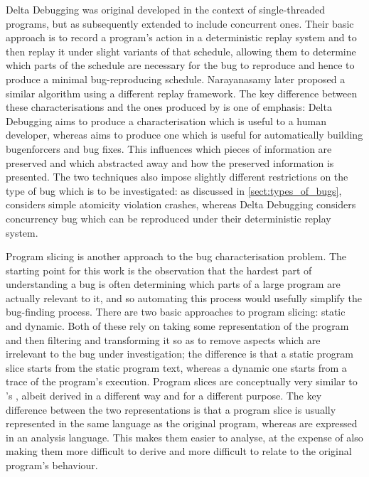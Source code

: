 Delta Debugging was original developed in the context of
single-threaded programs, but as subsequently extended to include
concurrent ones\cite{Choi2002}.  Their basic approach is to record a
program's action in a deterministic replay system and to then replay
it under slight variants of that schedule, allowing them to determine
which parts of the schedule are necessary for the bug to reproduce and
hence to produce a minimal bug-reproducing schedule.
Narayanasamy\cite{Narayanasamy2007} later proposed a similar algorithm
using a different replay framework.  The key difference between these
characterisations and the ones produced by {\technique} is one of
emphasis: Delta Debugging aims to produce a characterisation which is
useful to a human developer, whereas {\technique} aims to produce one
which is useful for automatically building \glspl{bugenforcer} and bug
fixes.  This influences which pieces of information are preserved and
which abstracted away and how the preserved information is presented.
The two techniques also impose slightly different restrictions on the
type of bug which is to be investigated: as discussed in
\autoref{sect:types_of_bugs}, {\technique} considers simple atomicity
violation crashes, whereas Delta Debugging considers concurrency bug
which can be reproduced under their deterministic replay system.

Program slicing is another approach to the bug characterisation
problem.  The starting point for this work is the observation that the
hardest part of understanding a bug is often determining which parts
of a large program are actually relevant to it, and so automating this
process would usefully simplify the bug-finding process.  There are
two basic approaches to program slicing: static\cite{Weiser1981} and
dynamic\cite{Agrawal1990a}.  Both of these rely on taking some
representation of the program and then filtering and transforming it
so as to remove aspects which are irrelevant to the bug under
investigation; the difference is that a static program slice starts
from the static program text, whereas a dynamic one starts from a
trace of the program's execution.  Program slices are conceptually
very similar to {\technique}'s {\StateMachines}, albeit derived in a
different way and for a different purpose.  The key difference between
the two representations is that a program slice is usually represented
in the same language as the original program, whereas {\StateMachines}
are expressed in an analysis language.  This makes them easier to
analyse, at the expense of also making them more difficult to derive
and more difficult to relate to the original program's behaviour.

